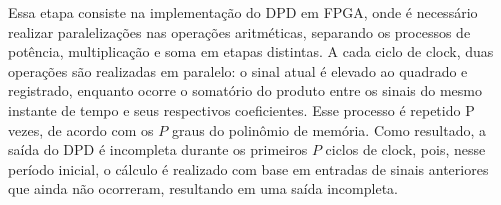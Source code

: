Essa etapa consiste na implementação do DPD em FPGA, onde é necessário realizar paralelizações nas operações aritméticas, separando os processos de potência, multiplicação e soma em etapas distintas. A cada ciclo de clock, duas operações são realizadas em paralelo: o sinal atual é elevado ao quadrado e registrado, enquanto ocorre o somatório do produto entre os sinais do mesmo instante de tempo e seus respectivos coeficientes. Esse processo é repetido P vezes, de acordo com os \( P \) graus do polinômio de memória. Como resultado, a saída do DPD é incompleta durante os primeiros \( P \) ciclos de clock, pois, nesse período inicial, o cálculo é realizado com base em entradas de sinais anteriores que ainda não ocorreram, resultando em uma saída incompleta.
